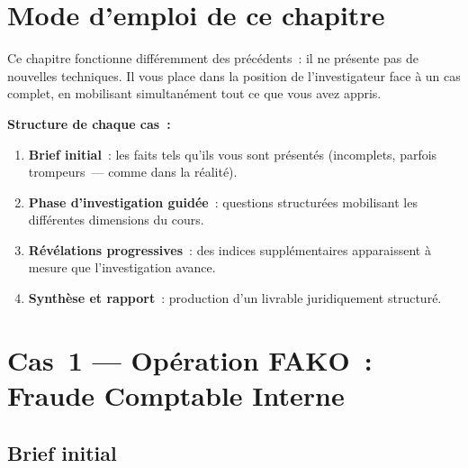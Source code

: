 \bigskip

\section*{Mode d'emploi de ce chapitre}

Ce chapitre fonctionne différemment des précédents~: il ne présente
pas de nouvelles techniques. Il vous place dans la position de
l'investigateur face à un cas complet, en mobilisant simultanément
tout ce que vous avez appris.

\textbf{Structure de chaque cas~:}
\begin{enumerate}
    \item \textbf{Brief initial}~: les faits tels qu'ils vous sont
          présentés (incomplets, parfois trompeurs~--- comme dans
          la réalité).
    \item \textbf{Phase d'investigation guidée}~: questions structurées
          mobilisant les différentes dimensions du cours.
    \item \textbf{Révélations progressives}~: des indices supplémentaires
          apparaissent à mesure que l'investigation avance.
    \item \textbf{Synthèse et rapport}~: production d'un livrable
          juridiquement structuré.
\end{enumerate}

\separateur

\section{Cas~1 --- Opération FAKO~: Fraude Comptable Interne}
\label{sec:cas-fako}

\subsection{Brief initial}

